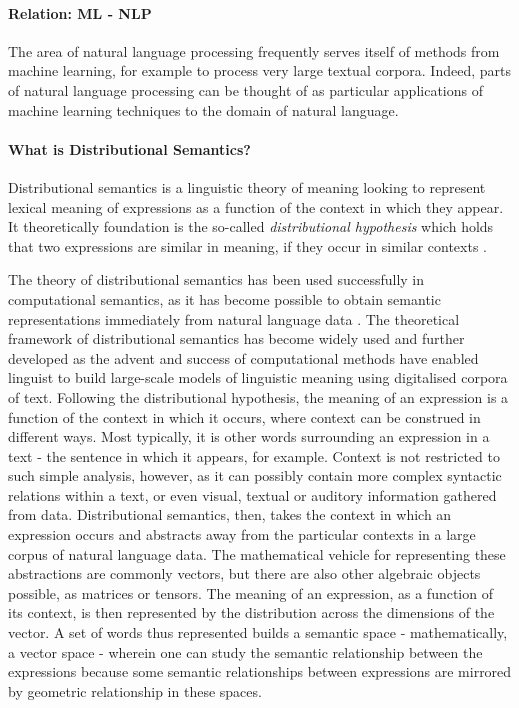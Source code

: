 \documentclass{article}
\begin{document}
\paragraph{Relation: ML - NLP}
The area of natural language processing frequently serves itself of methods from machine learning, for example to process very large textual corpora. Indeed, parts of natural language processing can be thought of as particular applications of machine learning techniques to the domain of natural language.
\paragraph{What is Distributional Semantics?}
Distributional semantics is a linguistic theory of meaning looking to represent lexical meaning of expressions as a function of the context in which they appear. It theoretically foundation is the so-called \emph{distributional hypothesis} which holds that two expressions are similar in meaning, if they occur in similar contexts \cite{harris1954distributional}.

The theory of distributional semantics has been used successfully in computational semantics, as it has become possible to obtain semantic representations immediately from natural language data . The theoretical framework of distributional semantics has become widely used and further developed as the advent and success of computational methods have enabled linguist to build large-scale models of linguistic meaning using digitalised corpora of text. 
Following the distributional hypothesis, the meaning of an expression is a function of the context in which it occurs, where context can be construed in different ways. Most typically, it is other words surrounding an expression in a text - the sentence in which it appears, for example. Context is not restricted to such simple analysis, however, as it can possibly contain more complex syntactic relations within a text, or even visual, textual or auditory information gathered from data.
\cite{boleda2016formal}
Distributional semantics, then, takes the context in which an expression occurs and abstracts away from the particular contexts in a large corpus of natural language data. The mathematical vehicle for representing these abstractions are commonly vectors, but there are also other algebraic objects possible, as matrices or tensors. The meaning of an expression, as a function of its context, is then represented by the distribution across the dimensions of the vector. A set of words thus represented builds a semantic space - mathematically, a vector space - wherein one can study the semantic relationship between the expressions because some semantic relationships between expressions are mirrored by geometric relationship in these spaces.
\end{document}
